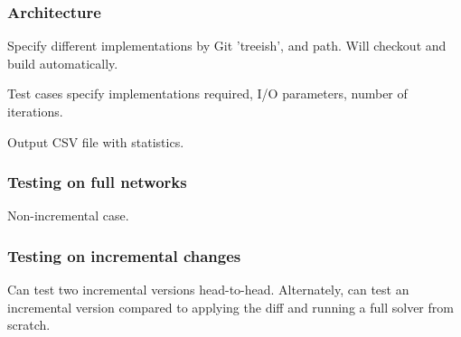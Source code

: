 \subsubsection{Architecture}

Specify different implementations by Git 'treeish', and path. Will checkout and build automatically. 

Test cases specify implementations required, I/O parameters, number of iterations.

Output CSV file with statistics.

\subsubsection{Testing on full networks}

Non-incremental case.

\subsubsection{Testing on incremental changes}

Can test two incremental versions head-to-head. Alternately, can test an incremental version compared to applying the diff and running a full solver from scratch.